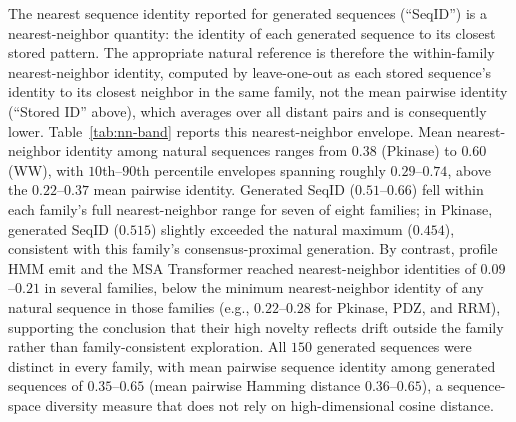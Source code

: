\documentclass[10pt]{article}
\begin{document}
The nearest sequence identity reported for generated sequences (``SeqID'') is a nearest-neighbor quantity: the identity of each generated sequence to its closest stored pattern. The appropriate natural reference is therefore the within-family nearest-neighbor identity, computed by leave-one-out as each stored sequence's identity to its closest neighbor in the same family, not the mean pairwise identity (``Stored ID'' above), which averages over all distant pairs and is consequently lower. Table~\ref{tab:nn-band} reports this nearest-neighbor envelope. Mean nearest-neighbor identity among natural sequences ranges from $0.38$ (Pkinase) to $0.60$ (WW), with $10$th--$90$th percentile envelopes spanning roughly $0.29$--$0.74$, above the $0.22$--$0.37$ mean pairwise identity. Generated SeqID ($0.51$--$0.66$) fell within each family's full nearest-neighbor range for seven of eight families; in Pkinase, generated SeqID ($0.515$) slightly exceeded the natural maximum ($0.454$), consistent with this family's consensus-proximal generation. By contrast, profile HMM emit and the MSA Transformer reached nearest-neighbor identities of $0.09$--$0.21$ in several families, below the minimum nearest-neighbor identity of any natural sequence in those families (e.g., $0.22$--$0.28$ for Pkinase, PDZ, and RRM), supporting the conclusion that their high novelty reflects drift outside the family rather than family-consistent exploration. All $150$ generated sequences were distinct in every family, with mean pairwise sequence identity among generated sequences of $0.35$--$0.65$ (mean pairwise Hamming distance $0.36$--$0.65$), a sequence-space diversity measure that does not rely on high-dimensional cosine distance.
\end{document}
